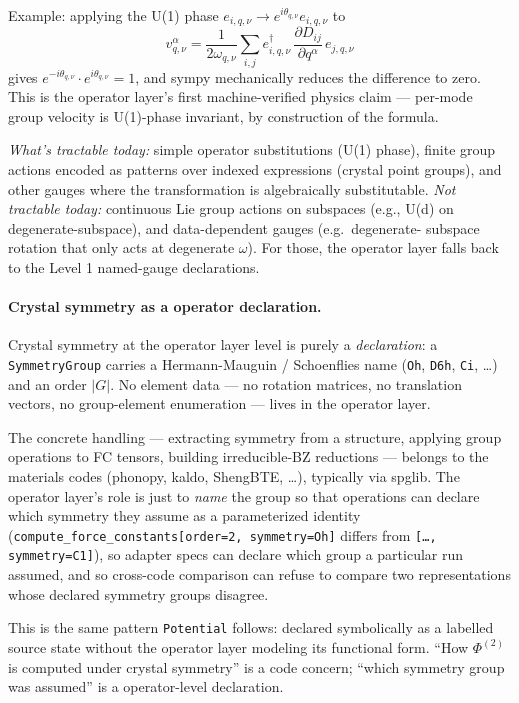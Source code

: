 \documentclass[11pt,a4paper]{article}
\begin{document}
Example: applying the U(1) phase $e_{i,q,\nu} \to e^{i\theta_{q,\nu}}
e_{i,q,\nu}$ to
\begin{equation*}
  v^\alpha_{q,\nu} = \frac{1}{2\omega_{q,\nu}} \sum_{i,j} e^\dagger_{i,q,\nu}\,
    \frac{\partial D_{ij}}{\partial q^\alpha}\, e_{j,q,\nu}
\end{equation*}
gives $e^{-i\theta_{q,\nu}} \cdot e^{i\theta_{q,\nu}} = 1$, and sympy
mechanically reduces the difference to zero. This is the operator layer's
first machine-verified physics claim --- per-mode group velocity is
U(1)-phase invariant, by construction of the formula.

\emph{What's tractable today:} simple operator substitutions (U(1)
phase), finite group actions encoded as patterns over indexed
expressions (crystal point groups), and other gauges where the
transformation is algebraically substitutable. \emph{Not tractable
today:} continuous Lie group actions on subspaces (e.g., U(d) on
degenerate-subspace), and data-dependent gauges (e.g.\ degenerate-
subspace rotation that only acts at degenerate $\omega$). For those,
the operator layer falls back to the Level 1 named-gauge declarations.

\paragraph{Crystal symmetry as a operator declaration.} Crystal symmetry
at the operator layer level is purely a \emph{declaration}: a
\texttt{SymmetryGroup} carries a Hermann-Mauguin / Schoenflies name
(\texttt{Oh}, \texttt{D6h}, \texttt{Ci}, \ldots) and an order $|G|$.
No element data --- no rotation matrices, no translation vectors, no
group-element enumeration --- lives in the operator layer.

The concrete handling --- extracting symmetry from a structure,
applying group operations to FC tensors, building irreducible-BZ
reductions --- belongs to the materials codes (phonopy, kaldo,
ShengBTE, \ldots), typically via spglib. The operator layer's role is just to
\emph{name} the group so that operations can declare which symmetry they
assume as a parameterized identity
(\texttt{compute\_force\_constants[order=2, symmetry=Oh]} differs from
\texttt{[\ldots, symmetry=C1]}), so adapter specs can declare which
group a particular run assumed, and so cross-code comparison can refuse
to compare two representations whose declared symmetry groups disagree.

This is the same pattern \texttt{Potential} follows: declared symbolically
as a labelled source state without the operator layer modeling its functional
form. ``How $\Phi^{(2)}$ is computed under crystal symmetry'' is a code
concern; ``which symmetry group was assumed'' is a operator-level
declaration.
\end{document}
